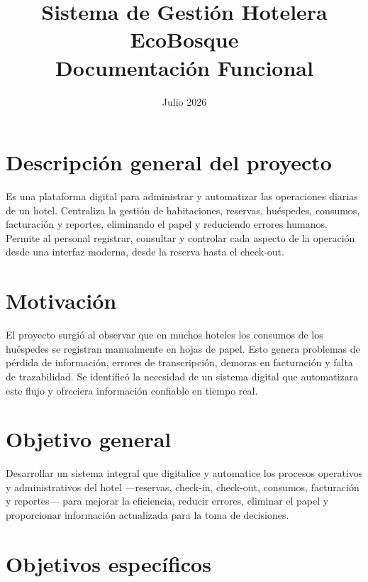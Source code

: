 \documentclass[12pt,a4paper]{article}
\title{\textbf{Sistema de Gestión Hotelera EcoBosque}\\[4pt]\large Documentación Funcional}
\date{Julio 2026}
\author{}
\begin{document}
\maketitle
\thispagestyle{empty}
\newpage

\section{Descripción general del proyecto}

Es una plataforma digital para administrar y automatizar las operaciones diarias de un hotel. Centraliza la gestión de habitaciones, reservas, huéspedes, consumos, facturación y reportes, eliminando el papel y reduciendo errores humanos. Permite al personal registrar, consultar y controlar cada aspecto de la operación desde una interfaz moderna, desde la reserva hasta el check-out.

\section{Motivación}

El proyecto surgió al observar que en muchos hoteles los consumos de los huéspedes se registran manualmente en hojas de papel. Esto genera problemas de pérdida de información, errores de transcripción, demoras en facturación y falta de trazabilidad. Se identificó la necesidad de un sistema digital que automatizara este flujo y ofreciera información confiable en tiempo real.

\section{Objetivo general}

Desarrollar un sistema integral que digitalice y automatice los procesos operativos y administrativos del hotel ---reservas, check-in, check-out, consumos, facturación y reportes--- para mejorar la eficiencia, reducir errores, eliminar el papel y proporcionar información actualizada para la toma de decisiones.

\section{Objetivos específicos}
\end{document}
